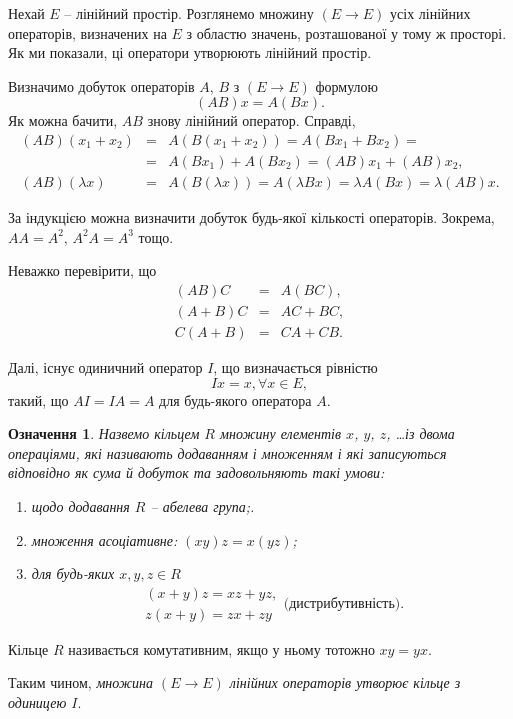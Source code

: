 \documentclass[14pt,twoside]{extreport}
\theoremstyle{mystyle}
\newtheorem{dfn}{Означення}
\numberwithin{equation}{chapter}
\begin{document}
Нехай $E$ -- лінійний простір. Розглянемо множину $(E \to E)$ усіх лінійних операторів, визначених на $E$ з областю значень, розташованої у тому ж просторі. Як ми показали, ці оператори утворюють лінійний простір.

Визначимо добуток операторів $A$, $B$ з $(E \to E)$ формулою
\[
(AB)x=A(Bx).
\]
Як можна бачити, $AB$ знову лінійний оператор. Справді,
\[
\begin{array}{rll}
(AB)(x_1+x_2)&=&A(B(x_1+x_2))=A(Bx_1 + Bx_2)=\\
&=&A(Bx_1) + A(Bx_2)=(AB)x_1 + (AB)x_2,\\
(AB)(\lambda x)&=&A(B(\lambda x))=A(\lambda Bx)=\lambda A(Bx)=\lambda (AB)x.
\end{array}
\]

За індукцією можна визначити добуток будь-якої кількості операторів. Зокрема, $AA=A^2$, $A^2A=A^3$ тощо.

Неважко перевірити, що
\[
\begin{array}{rcl}
(AB)C & = & A(BC),\\
(A+B)C & = & AC + BC,\\
C(A+B) & = & CA + CB.
\end{array}
\]

Далі, існує одиничний оператор $I$, що визначається рівністю
\[
Ix=x, \forall x \in E,
\]
такий, що $AI = IA =A$ для будь-якого оператора $A$.

\begin{dfn}
	Назвемо кільцем $R$ множину елементів $x$, $y$, $z$, \ldots із двома операціями, які називають додаванням і множенням і які записуються відповідно як сума й добуток та задовольняють такі умови:
	\begin{enumerate}
		\item щодо додавання $R$ -- абелева група;.
		\item множення асоціативне: $(xy)z =x(yz)$;
		\item для будь-яких $x, y, z \in R$
		\[
		\begin{array}{l}
		(x+y)z=xz+yz,\\
		z(x+y)=zx+zy
		\end{array}\textrm{(дистрибутивність).}
		\]
	\end{enumerate}
\end{dfn}

Кільце $R$ називається комутативним, якщо у ньому тотожно $xy = yx$.

Таким чином, \emph{множина $(E \to E)$ лінійних операторів утворює кільце з одиницею $I$}.
\end{document}
